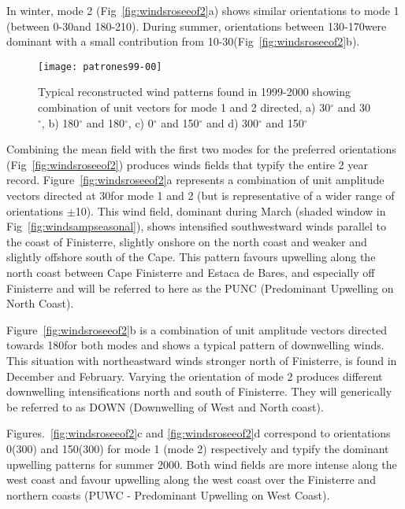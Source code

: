 In winter, mode 2 ({Fig~\ref{fig:windsroseeof2}}a) shows similar
orientations to mode 1 (between 0-30\deg and 180-210\deg). During
summer, orientations between 130-170\deg were dominant with a
small contribution from 10-30\deg (Fig~\ref{fig:windsroseeof2}b).

\begin{figure}
\centering
\texttt{[image: patrones99-00]}
\caption{Typical reconstructed wind patterns found in 1999-2000
showing combination of unit vectors for mode 1 and 2 directed, a)
30$^\circ$ and 30$^\circ$, b) 180$^\circ$ and 180$^\circ$, c)
0$^\circ$ and 150$^\circ$ and d) 300$^\circ$ and 150$^\circ$}
\label{fig:windsreconfig}
\end{figure}

Combining the mean field with the first two modes for the
preferred orientations ({Fig~\ref{fig:windsroseeof2}}) produces
winds fields that typify the entire 2 year record.
Figure~\ref{fig:windsroseeof2}a represents a combination of unit
amplitude vectors directed at 30\deg for mode 1 and 2 (but is
representative of a wider range of orientations $\pm$10\deg). This
wind field, dominant during March (shaded window in
Fig~\ref{fig:windsampseasonal}), shows intensified southwestward
winds parallel to the coast of Finisterre, slightly onshore on the
north coast and weaker and slightly offshore south of the Cape.
This pattern favours upwelling along the north coast between Cape
Finisterre and Estaca de Bares, and especially off Finisterre and
will be referred to here as the PUNC (Predominant Upwelling on
North Coast).

Figure~\ref{fig:windsroseeof2}b is a combination of unit amplitude
vectors directed towards 180\deg for both modes and shows a
typical pattern of downwelling winds. This situation with
northeastward winds stronger north of Finisterre, is found in
December and February. Varying the orientation of mode 2 produces
different downwelling intensifications north and south of
Finisterre. They will generically be referred to as DOWN
(Downwelling of West and North coast).

Figures.~\ref{fig:windsroseeof2}c and \ref{fig:windsroseeof2}d
correspond to orientations 0\deg (300\deg) and 150\deg (300\deg)
for mode 1 (mode 2) respectively and typify the dominant upwelling
patterns for summer 2000. Both wind fields are more intense along
the west coast and favour upwelling along the west coast over the
Finisterre and northern coasts (PUWC - Predominant Upwelling on
West Coast).

